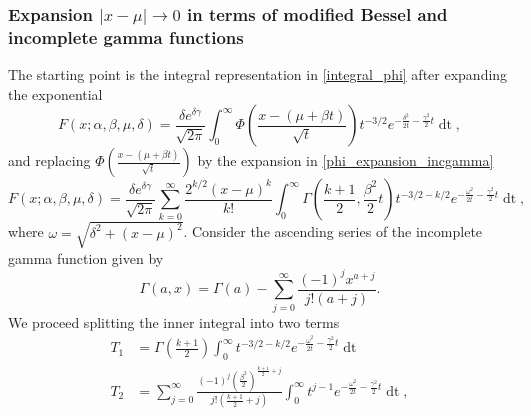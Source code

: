 \documentclass[10pt,a4paper,oneside]{article}
\numberwithin{equation}{section}
\begin{document}

\subsubsection{Expansion $|x-\mu| \to 0$ in terms of modified Bessel and incomplete gamma functions}
The starting point is the integral representation in \eqref{integral_phi} after expanding the exponential
\begin{equation*}
F(x;\alpha, \beta, \mu, \delta) = \frac{\delta e^{\delta \gamma}}{\sqrt{2\pi}} \int_{0}^{\infty} \Phi\left(\frac{x - (\mu +\beta t)}{\sqrt{t}}\right) t^{-3/2} e^{-\frac{\delta^2}{2t} - \frac{\gamma^2}{2}t} \mathop{dt},
\end{equation*}
and replacing $\Phi\left(\frac{x - (\mu +\beta t)}{\sqrt{t}}\right)$ by the expansion in \eqref{phi_expansion_incgamma}
\begin{equation*}
F(x;\alpha, \beta, \mu, \delta) = \frac{\delta e^{\delta \gamma}}{\sqrt{2\pi}} \sum_{k=0}^{\infty}\frac{2^{k/2}(x-\mu)^k}{k!}\int_0^{\infty}\Gamma\left(\frac{k+1}{2}, \frac{\beta^2}{2}t\right) t^{-3/2-k/2} e^{-\frac{\omega^2}{2t} - \frac{\gamma^2}{2}t} \mathop{dt},
\end{equation*}
where $\omega = \sqrt{\delta^2 + (x-\mu)^2}$. Consider the ascending series of the incomplete gamma function given by \cite[\S 8.7]{NIST:DLMF}
\begin{equation}
\Gamma(a, x) = \Gamma(a) - \sum_{j=0}^{\infty} \frac{(-1)^j x^{a+j}}{j! (a+ j)}.
\end{equation}
We proceed splitting the inner integral into two terms
\begin{align}
T_1 &= \Gamma\left(\frac{k+1}{2}\right)\int_0^{\infty}t^{-3/2-k/2} e^{-\frac{\omega^2}{2t} - \frac{\gamma^2}{2}t} \mathop{dt}\\
T_2 &= \sum_{j=0}^{\infty} \frac{(-1)^j \left(\frac{\beta^2}{2}\right)^{\frac{k+1}{2}+j}}{j! (\frac{k+1}{2}+ j)}\int_0^{\infty} t^{j-1} e^{-\frac{\omega^2}{2t} - \frac{\gamma^2}{2}t} \mathop{dt},
\end{align}
\end{document}
